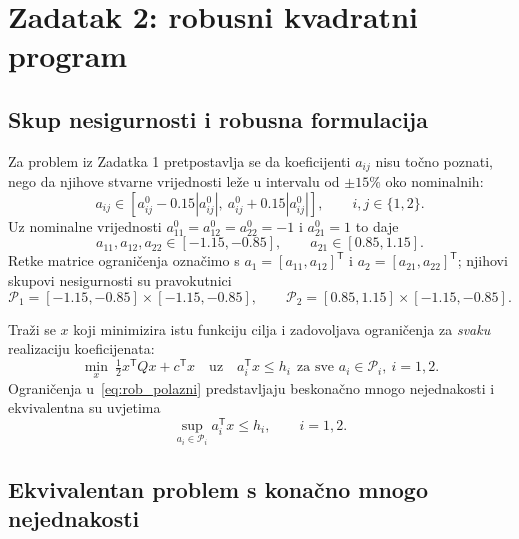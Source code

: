 \section{Zadatak 2: robusni kvadratni program}

\subsection{Skup nesigurnosti i robusna formulacija}

Za problem iz Zadatka 1 pretpostavlja se da koeficijenti $a_{ij}$ nisu točno poznati, nego da njihove stvarne vrijednosti leže u intervalu od $\pm 15\%$ oko nominalnih:
\begin{equation}
a_{ij} \in \left[a_{ij}^0 - 0.15|a_{ij}^0|,\ a_{ij}^0 + 0.15|a_{ij}^0|\right], \qquad i, j \in \{1, 2\}.
\label{eq:rob_interval}
\end{equation}
Uz nominalne vrijednosti $a_{11}^0 = a_{12}^0 = a_{22}^0 = -1$ i $a_{21}^0 = 1$ to daje
\begin{equation}
a_{11}, a_{12}, a_{22} \in [-1.15, -0.85], \qquad a_{21} \in [0.85, 1.15].
\end{equation}
Retke matrice ograničenja označimo s $a_1 = [a_{11}, a_{12}]^{\mathsf{T}}$ i $a_2 = [a_{21}, a_{22}]^{\mathsf{T}}$; njihovi skupovi nesigurnosti su pravokutnici
\begin{equation}
\mathcal{P}_1 = [-1.15, -0.85] \times [-1.15, -0.85], \qquad
\mathcal{P}_2 = [0.85, 1.15] \times [-1.15, -0.85].
\end{equation}

Traži se $x$ koji minimizira istu funkciju cilja i zadovoljava ograničenja za \emph{svaku} realizaciju koeficijenata:
\begin{equation}
\min_{x} \ \tfrac{1}{2} x^{\mathsf{T}} Q x + c^{\mathsf{T}} x
\quad \text{uz} \quad
a_i^{\mathsf{T}} x \leq h_i \ \ \text{za sve } a_i \in \mathcal{P}_i, \ i = 1, 2.
\label{eq:rob_polazni}
\end{equation}
Ograničenja u~\eqref{eq:rob_polazni} predstavljaju beskonačno mnogo nejednakosti i ekvivalentna su uvjetima
\begin{equation}
\sup_{a_i \in \mathcal{P}_i} a_i^{\mathsf{T}} x \leq h_i, \qquad i = 1, 2.
\end{equation}

\subsection{Ekvivalentan problem s konačno mnogo nejednakosti}

